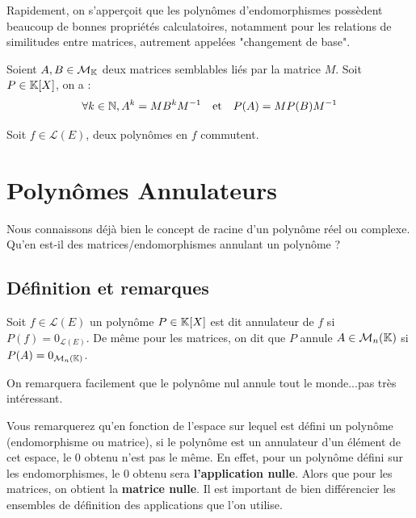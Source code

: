 Rapidement, on s'apperçoit que les polynômes d'endomorphismes possèdent beaucoup de bonnes propriétés calculatoires, 
notamment pour les relations de similitudes entre matrices, autrement appelées "changement de base". 

\begin{prop}
    Soient $A,B\in \mathcal{M}_{\mathbb{K}}$ deux matrices semblables liés par la matrice $M$. Soit $P \in \mathbb{K}[X]$, on a :
        $$ \forall k \in \mathbb{N}, A^k = M B^k M ^{-1} \quad \text{et} \quad  P(A) = M P(B) M^{-1} $$
\end{prop}

\begin{prop}[Commutation]
    Soit $f \in \mathcal{L}(E)$, deux polynômes en $f$ commutent. 
\end{prop}



\section{Polynômes Annulateurs}

Nous connaissons déjà bien le concept de racine d'un polynôme réel ou complexe. 
Qu'en est-il des matrices/endomorphismes annulant un polynôme ?

\subsection{Définition et remarques}

\begin{definition}
    Soit $ f \in \mathcal{L}(E)$ un polynôme $ P \in \mathbb{K}[X]$ est dit annulateur de $f$ si $P(f) = 0_{\mathcal{L}(E)}$. 
    De même pour les matrices, on dit que $P$ annule $A \in \mathcal{M}_n(\mathbb{K})$ si $P(A) = 0_{\mathcal{M}_n(\mathbb{K})}$. 
\end{definition}

On remarquera facilement que le polynôme nul annule tout le monde...pas très intéressant. 

\begin{remark}
    Vous remarquerez qu'en fonction de l'espace sur lequel est défini un polynôme (endomorphisme ou matrice), 
    si le polynôme est un annulateur d'un élément de cet espace, le $0$ obtenu n'est pas le même. 
    En effet, pour un polynôme défini sur les endomorphismes, le 0 obtenu sera \textbf{l'application nulle}. 
    Alors que pour les matrices, on obtient la \textbf{matrice nulle}. 
    Il est important de bien différencier les ensembles de définition des applications que l'on utilise. 
\end{remark}

